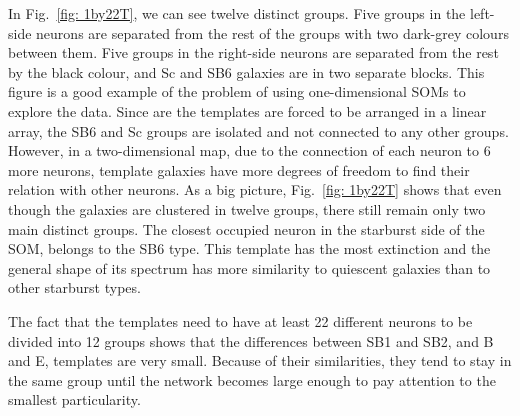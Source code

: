             In Fig.~\ref{fig: 1by22T}, we can see twelve distinct groups.
            Five groups in the left-side neurons are separated from the rest of the groups with two dark-grey colours between them.
            Five groups in the right-side neurons are separated from the rest by the black colour, and Sc and SB6 galaxies are in two separate blocks.
            This figure is a good example of the problem of using one-dimensional SOMs to explore the data.
            Since are the templates are forced to be arranged in a linear array, the SB6 and Sc groups are isolated and not connected to any other groups.
            However, in a two-dimensional map, due to the connection of each neuron to 6 more neurons, template galaxies have more degrees of freedom to find their relation with other neurons.
            As a big picture, Fig.~\ref{fig: 1by22T} shows that even though the galaxies are clustered in twelve groups, there still remain only two main distinct groups.
            The closest occupied neuron in the starburst side of the SOM, belongs to the SB6 type. 
            This template has the most extinction and  the general shape of its spectrum has more similarity to quiescent galaxies than to other starburst types. 
            
            The fact that the templates need to have at least 22 different neurons to be divided into 12 groups shows that the differences between SB1 and SB2, and B and E, templates are very small.
            Because of their similarities, they tend to stay in the same group until the network becomes large enough to pay attention to the smallest particularity.
           
